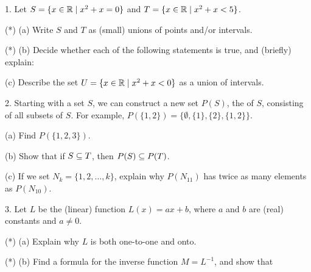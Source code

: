 \documentclass[12pt]{article}
\begin{document}
\begin{description}

\item{1.} Let $S = \{ x\in{\mathbb R} \mid x^2+x = 0\}$ and
$T = \{ x\in{\mathbb R} \mid x^2+x < 5\}$.

\item{(*)} (a) Write $S$ and $T$ as (small) unions of points and/or intervals.

\ssk

\item{(*)} (b) Decide whether each of the following statements is true, and
(briefly) explain: 

\ssk


\ssk

\item{\spc} (c) Describe the set $U = \{x\in{\mathbb R} \mid x^2+x<0\}$ as a union of intervals.

\msk

\item{2.} Starting with a set $S$, we can construct a new
set $P(S)$, the   of $S$, consisting of all subsets of $S$.
For example, $P(\{1,2\}) = \{\emptyset,\{1\},\{2\},\{1,2\}\}$. 

\ssk

\item{\spc} (a) Find $P(\{1,2,3\})$.

\ssk

\item{\spc} (b) Show that if $S\subseteq T$, then $P(S)\subseteq P(T)$.

\ssk

\item{\spc} (c) If we set $N_k = \{1,2,\ldots,k\}$, explain why
$P(N_{11})$ has twice as many elements as $P(N_{10})$.

\msk

\item{3.} Let $L$ be the (linear) function
$L(x) = ax+b$, where $a$ and $b$ are (real) constants and $a\neq 0$.

\ssk

\item{(*)} (a) Explain why $L$ is both one-to-one and onto.

\ssk

\item{(*)} (b) Find a formula for the inverse function 
$M=L^{-1}$, and show that 


\end{description}
\end{document}
